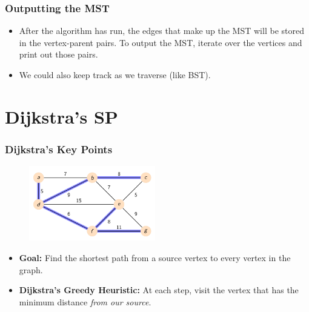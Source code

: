 \documentclass{beamer}
\begin{document}
\begin{frame}[fragile]
    \frametitle{Outputting the MST}
    \centering
    \begin{itemize}
        \item After the algorithm has run, the edges that make up the MST will be stored in the vertex-parent pairs. To output the MST, iterate over the vertices and print out those pairs.
        \item We could also keep track as we traverse (like BST).
    \end{itemize}
\end{frame}

\section{Dijkstra's SP}

\begin{frame}[fragile]
    \frametitle{Dijkstra's Key Points}
    \begin{figure}[H]
        \includegraphics[width=0.49\textwidth]{./imgs/dijkstra-from-d.png}
    \end{figure}
    \begin{itemize}
        \item \textbf{Goal:} Find the shortest path from a source vertex to every vertex in the graph.
        \item \textbf{Dijkstra's Greedy Heuristic:} At each step, visit the vertex that has the minimum distance \textit{from our source}.
    \end{itemize}
\end{frame}
\end{document}
